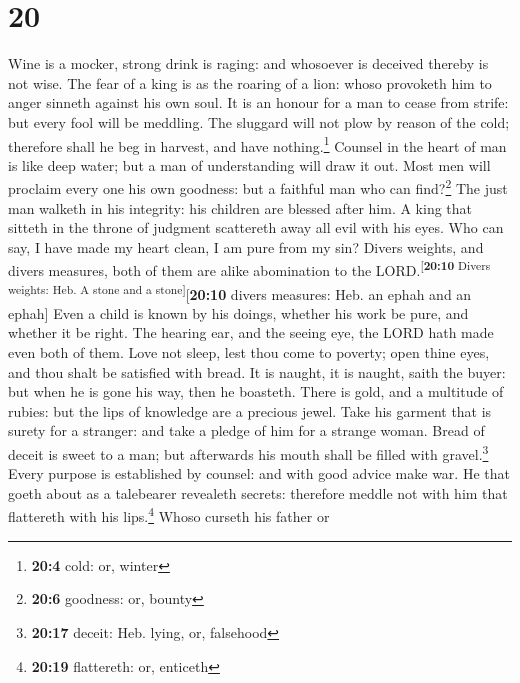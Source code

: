 \hypertarget{section-19}{%
\section{20}\label{section-19}}

 Wine is a mocker, strong drink is raging: and whosoever
is deceived thereby is not wise.  The fear of a king is as
the roaring of a lion: whoso provoketh him to anger sinneth against his
own soul.  It is an honour for a man to cease from strife:
but every fool will be meddling.  The sluggard will not
plow by reason of the cold; therefore shall he beg in harvest, and have
nothing.\footnote{\textbf{20:4} cold: or, winter}  Counsel
in the heart of man is like deep water; but a man of understanding will
draw it out.  Most men will proclaim every one his own
goodness: but a faithful man who can find?\footnote{\textbf{20:6}
  goodness: or, bounty}  The just man walketh in his
integrity: his children are blessed after him.  A king
that sitteth in the throne of judgment scattereth away all evil with his
eyes.  Who can say, I have made my heart clean, I am pure
from my sin?  Divers weights, and divers measures, both
of them are alike abomination to the
LORD.\textsuperscript{{[}\textbf{20:10} Divers weights: Heb. A stone and
a stone{]}}{[}\textbf{20:10} divers measures: Heb. an ephah and an
ephah{]}  Even a child is known by his doings, whether
his work be pure, and whether it be right.  The hearing
ear, and the seeing eye, the LORD hath made even both of them.
 Love not sleep, lest thou come to poverty; open thine
eyes, and thou shalt be satisfied with bread.  It is
naught, it is naught, saith the buyer: but when he is gone his way, then
he boasteth.  There is gold, and a multitude of rubies:
but the lips of knowledge are a precious jewel.  Take his
garment that is surety for a stranger: and take a pledge of him for a
strange woman.  Bread of deceit is sweet to a man; but
afterwards his mouth shall be filled with gravel.\footnote{\textbf{20:17}
  deceit: Heb. lying, or, falsehood}  Every purpose is
established by counsel: and with good advice make war. 
He that goeth about as a talebearer revealeth secrets: therefore meddle
not with him that flattereth with his lips.\footnote{\textbf{20:19}
  flattereth: or, enticeth}  Whoso curseth his father or
